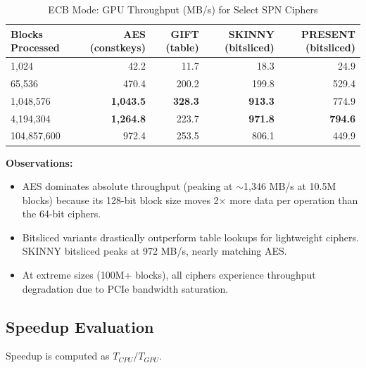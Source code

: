 \documentclass{article}
\begin{document}
\begin{table}[h!]
\centering
\caption{ECB Mode: GPU Throughput (MB/s) for Select SPN Ciphers}
\begin{tabular}{@{}lrrrr@{}}
\toprule
\textbf{Blocks Processed} & \textbf{AES (constkeys)} & \textbf{GIFT (table)} & \textbf{SKINNY (bitsliced)} & \textbf{PRESENT (bitsliced)} \\ \midrule
1,024                     & 42.2                     & 11.7                  & 18.3                        & 24.9                         \\
65,536                    & 470.4                    & 200.2                 & 199.8                       & 529.4                        \\
1,048,576                 & \textbf{1,043.5}         & \textbf{328.3}        & \textbf{913.3}              & 774.9                        \\
4,194,304                 & \textbf{1,264.8}         & 223.7                 & \textbf{971.8}              & \textbf{794.6}               \\
104,857,600               & 972.4                    & 253.5                 & 806.1                       & 449.9                        \\ \bottomrule
\end{tabular}
\end{table}

\textbf{Observations:}
\begin{itemize}
    \item AES dominates absolute throughput (peaking at $\sim$1,346 MB/s at 10.5M blocks) because its 128-bit block size moves 2$\times$ more data per operation than the 64-bit ciphers.
    \item Bitsliced variants drastically outperform table lookups for lightweight ciphers. SKINNY bitsliced peaks at 972 MB/s, nearly matching AES.
    \item At extreme sizes (100M+ blocks), all ciphers experience throughput degradation due to PCIe bandwidth saturation.
\end{itemize}

\subsection{Speedup Evaluation}

Speedup is computed as $T_{CPU} / T_{GPU}$.
\end{document}
